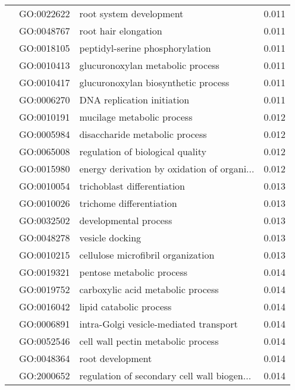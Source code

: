 \begin{longtable}{lllr}
   & GO:0022622 &                      root system development &         0.011 \\
   & GO:0048767 &                         root hair elongation &         0.011 \\
   & GO:0018105 &              peptidyl-serine phosphorylation &         0.011 \\
   & GO:0010413 &             glucuronoxylan metabolic process &         0.011 \\
   & GO:0010417 &          glucuronoxylan biosynthetic process &         0.011 \\
   & GO:0006270 &                   DNA replication initiation &         0.011 \\
   & GO:0010191 &                   mucilage metabolic process &         0.012 \\
   & GO:0005984 &               disaccharide metabolic process &         0.012 \\
   & GO:0065008 &             regulation of biological quality &         0.012 \\
   & GO:0015980 &  energy derivation by oxidation of organi... &         0.012 \\
   & GO:0010054 &                  trichoblast differentiation &         0.013 \\
   & GO:0010026 &                     trichome differentiation &         0.013 \\
   & GO:0032502 &                        developmental process &         0.013 \\
   & GO:0048278 &                              vesicle docking &         0.013 \\
   & GO:0010215 &           cellulose microfibril organization &         0.013 \\
   & GO:0019321 &                    pentose metabolic process &         0.014 \\
   & GO:0019752 &            carboxylic acid metabolic process &         0.014 \\
   & GO:0016042 &                      lipid catabolic process &         0.014 \\
   & GO:0006891 &       intra-Golgi vesicle-mediated transport &         0.014 \\
   & GO:0052546 &           cell wall pectin metabolic process &         0.014 \\
   & GO:0048364 &                             root development &         0.014 \\
   & GO:2000652 &  regulation of secondary cell wall biogen... &         0.014 \\

\end{longtable}
